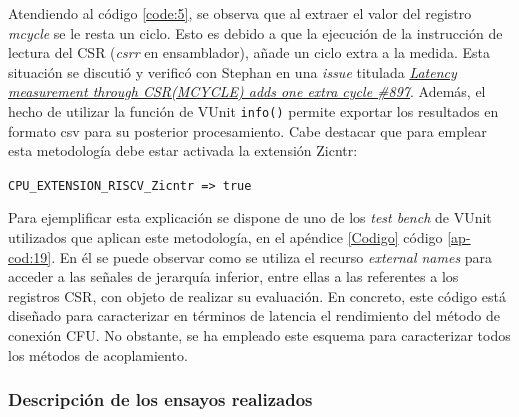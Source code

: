 Atendiendo al código \ref{code:5}, se observa que al extraer el valor del registro \textit{mcycle} se le resta un ciclo.
Esto es debido a que la ejecución de la instrucción de lectura del CSR (\textit{csrr} en ensamblador), añade un ciclo extra a la medida.
Esta situación se discutió y verificó con Stephan en una \textit{issue} titulada \href{https://github.com/stnolting/neorv32/issues/897}{\textit{Latency measurement through CSR(MCYCLE) adds one extra cycle \#897}}.
Además, el hecho de utilizar la función de VUnit \texttt{info()} permite exportar los resultados en formato csv para su posterior procesamiento.
Cabe destacar que para emplear esta metodología debe estar activada la extensión Zicntr:

\hspace{32mm} \texttt{CPU_EXTENSION_RISCV_Zicntr => true} 

Para ejemplificar esta explicación se dispone de uno de los \textit{test bench} de VUnit utilizados que aplican este metodología, en el apéndice \ref{Codigo} código \ref{ap-cod:19}.
En él se puede observar como se utiliza el recurso \textit{external names} para acceder a las señales de jerarquía inferior, entre ellas a las referentes a los registros CSR, con objeto de realizar su evaluación.
En concreto, este código está diseñado para caracterizar en términos de latencia el rendimiento del método de conexión CFU.
No obstante, se ha empleado este esquema para caracterizar todos los métodos de acoplamiento.

%
%

\subsubsection{Descripción de los ensayos realizados}

